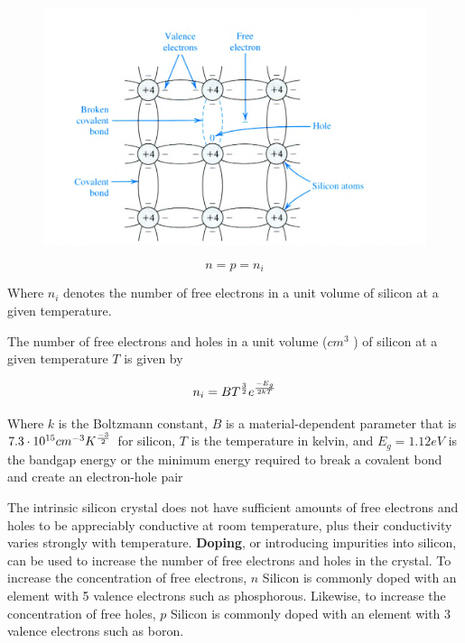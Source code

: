 \documentclass[../notes.tex]{subfiles}
\begin{document}
\begin{figure}[H]
	\centering
	\includegraphics[width=0.8\linewidth]{img/image_2022-10-19-14-32-35.png}
\end{figure}

\begin{equation}
	n = p = n_i
\end{equation}

Where $ n_i $ denotes the number of free electrons in a unit volume of silicon at a given temperature.

\begin{theorem}
	The number of free electrons and holes in a unit volume ($ cm^3 $ ) of silicon at a given temperature $ T $ is given by

	\begin{equation}
		n_i = BT^{3\over2} e^{-E_g \over {2kT}}
	\end{equation}

	Where $ k $ is the Boltzmann constant, $ B $ is a material-dependent parameter that is $ 7.3 \cdot  10^{15} cm^{-3}K^{-3 \over 2}$ for silicon, $ T $ is the temperature in kelvin, and $ E_g = 1.12eV $ is the bandgap energy or the minimum energy required to break a covalent bond and create an electron-hole pair
\end{theorem}


The intrinsic silicon crystal does not have sufficient amounts of free electrons and holes to be appreciably conductive at room temperature, plus their conductivity varies strongly with temperature.
\textbf{Doping}, or introducing impurities into silicon, can be used to increase the number of free electrons and holes in the crystal.
To increase the concentration of free electrons, $ n $ Silicon is commonly doped with an element with 5 valence electrons such as phosphorous.
Likewise, to increase the concentration of free holes, $ p $ Silicon is commonly doped with an element with 3 valence electrons such as boron.
\end{document}
